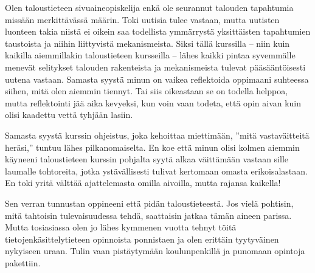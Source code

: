 \documentclass[12pt]{article}
\begin{document}
Olen taloustieteen sivuaineopiskelija enkä ole seurannut talouden tapahtumia missään merkittävässä määrin. Toki uutisia tulee vastaan, mutta uutisten luonteen takia niistä ei oikein saa todellista ymmärrystä yksittäisten tapahtumien taustoista ja niihin liittyvistä mekanismeista. Siksi tällä kurssilla -- niin kuin kaikilla aiemmillakin taloustieteen kursseilla --  lähes kaikki pintaa syvemmälle menevät selitykset talouden rakenteista ja mekanismeista tulevat pääsääntöisesti uutena vastaan. Samasta syystä minun on vaikea reflektoida oppimaani suhteessa siihen, mitä olen aiemmin tiennyt. Tai siis oikeastaan se on todella helppoa, mutta reflektointi jää aika kevyeksi, kun voin vaan todeta, että opin aivan kuin olisi kaadettu vettä tyhjään lasiin.

Samasta syystä kurssin ohjeistus, joka kehoittaa miettimään, ''mitä vastaväitteitä heräsi,'' tuntuu lähes pilkanomaiselta. En koe että minun olisi kolmen aiemmin käyneeni taloustieteen kurssin pohjalta syytä alkaa väittämään vastaan sille laumalle tohtoreita, jotka ystävällisesti tulivat kertomaan omasta erikoisalastaan. En toki yritä välttää ajattelemasta omilla aivoilla, mutta rajansa kaikella!

Sen verran tunnustan oppineeni että pidän taloustieteestä. Jos vielä pohtisin, mitä tahtoisin tulevaisuudessa tehdä, saattaisin jatkaa tämän aineen parissa. Mutta tosiasiassa olen jo lähes kymmenen vuotta tehnyt töitä tietojenkäsittelytieteen opinnoista ponnistaen ja olen erittäin tyytyväinen nykyiseen uraan. Tulin vaan pistäytymään koulunpenkillä ja punomaan opintoja pakettiin.
\end{document}
